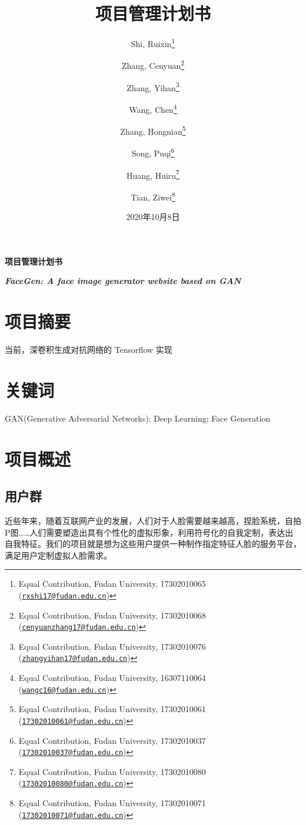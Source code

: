 \documentclass[hyperref, a4paper]{ctexart}
\title{\vspace{2in} 项目管理计划书\\\vspace{0.5em}{\large FaceGen: A face image generator website based on GAN}}
\author{Shi, Ruixin\footnote{Equal Contribution, Fudan University, 17302010065
  (\href{mailto:rxshi17@fudan.edu.cn}{\nolinkurl{rxshi17@fudan.edu.cn}})} \and Zhang, Cenyuan\footnote{Equal Contribution, Fudan University,
  17302010068
  (\href{mailto:cenyuanzhang17@fudan.edu.cn}{\nolinkurl{cenyuanzhang17@fudan.edu.cn}})} \and Zhang, Yihan\footnote{Equal Contribution, Fudan University, 17302010076
  (\href{mailto:zhangyihan17@fudan.edu.cn}{\nolinkurl{zhangyihan17@fudan.edu.cn}})} \and Wang, Chen\footnote{Equal Contribution, Fudan University, 16307110064
  (\href{mailto:wangc16@fudan.edu.cn}{\nolinkurl{wangc16@fudan.edu.cn}})} \and Zhang, Hongnian\footnote{Equal Contribution, Fudan University,
  17302010061
  (\href{mailto:17302010061@fudan.edu.cn}{\nolinkurl{17302010061@fudan.edu.cn}})} \and Song, Puqi\footnote{Equal Contribution, Fudan University, 17302010037
  (\href{mailto:17302010037@fudan.edu.cn}{\nolinkurl{17302010037@fudan.edu.cn}})} \and Huang, Huiru\footnote{Equal Contribution, Fudan University, 17302010080
  (\href{mailto:17302010080@fudan.edu.cn}{\nolinkurl{17302010080@fudan.edu.cn}})} \and Tian, Ziwei\footnote{Equal Contribution, Fudan University, 17302010071
  (\href{mailto:17302010071@fudan.edu.cn}{\nolinkurl{17302010071@fudan.edu.cn}})}}
\date{2020年10月8日}
\begin{document}
\maketitle

\newpage

\LARGE

\begin{center}
\textbf{项目管理计划书}
\end{center}

\large
\begin{center}
\textbf{\emph{FaceGen: A face image generator website based on GAN}}
\end{center}

\hypertarget{ux9879ux76eeux6458ux8981}{%
\section*{项目摘要}\label{ux9879ux76eeux6458ux8981}}

当前，深卷积生成对抗网络的 Tensorflow 实现

\hypertarget{ux5173ux952eux8bcd}{%
\section*{关键词}\label{ux5173ux952eux8bcd}}

GAN(Generative Adversarial Networks); Deep Learning; Face Generation

\normalsize

\newpage

\tableofcontents

\newpage

\hypertarget{ux9879ux76eeux6982ux8ff0}{%
\section{项目概述}\label{ux9879ux76eeux6982ux8ff0}}

\hypertarget{ux7528ux6237ux7fa4}{%
\subsection{用户群}\label{ux7528ux6237ux7fa4}}

近些年来，随着互联网产业的发展，人们对于人脸需要越来越高，捏脸系统，自拍P图\ldots\ldots 人们需要塑造出具有个性化的虚拟形象，利用符号化的自我定制，表达出自我特征。我们的项目就是想为这些用户提供一种制作指定特征人脸的服务平台，满足用户定制虚拟人脸需求。
\end{document}

